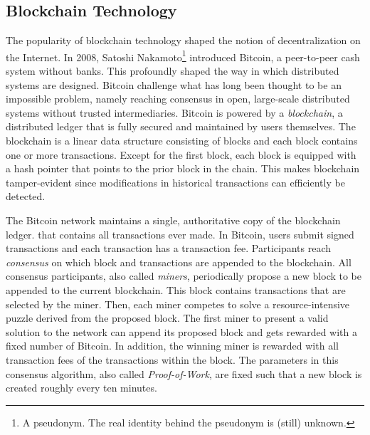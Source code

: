 \subsection{Blockchain Technology}
The popularity of blockchain technology shaped the notion of decentralization on the Internet.
In 2008, Satoshi Nakamoto\footnote{A pseudonym. The real identity behind the pseudonym is (still) unknown.} introduced Bitcoin, a peer-to-peer cash system without banks.
This profoundly shaped the way in which distributed systems are designed.
Bitcoin challenge what has long been thought to be an impossible problem, namely reaching consensus in open, large-scale distributed systems without trusted intermediaries.
Bitcoin is powered by a \emph{blockchain}, a distributed ledger that is fully secured and maintained by users themselves.
The blockchain is a linear data structure consisting of blocks and each block contains one or more transactions.
Except for the first block, each block is equipped with a hash pointer that points to the prior block in the chain.
This makes blockchain tamper-evident since modifications in historical transactions can efficiently be detected.

The Bitcoin network maintains a single, authoritative copy of the blockchain ledger. that contains all transactions ever made.
In Bitcoin, users submit signed transactions and each transaction has a transaction fee.
Participants reach \emph{consensus} on which block and transactions are appended to the blockchain.
All consensus participants, also called \emph{miners}, periodically propose a new block to be appended to the current blockchain.
This block contains transactions that are selected by the miner.
Then, each miner competes to solve a resource-intensive puzzle derived from the proposed block.
The first miner to present a valid solution to the network can append its proposed block and gets rewarded with a fixed number of Bitcoin.
In addition, the winning miner is rewarded with all transaction fees of the transactions within the block.
The parameters in this consensus algorithm, also called \emph{Proof-of-Work}, are fixed such that a new block is created roughly every ten minutes.

